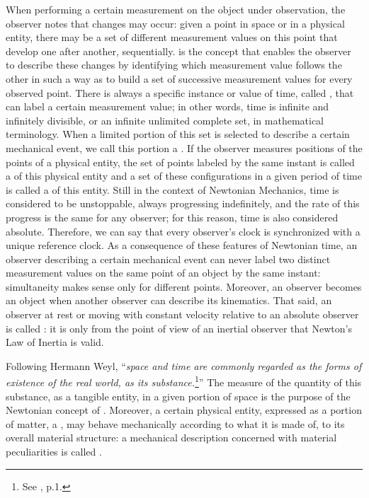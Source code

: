 When performing a certain measurement on the object under observation, the observer notes that changes may occur: given a point in space or in a physical entity, there may be a set of different measurement values on this point that develop one after another, sequentially.  is the concept that enables the observer to describe these changes by identifying which measurement value follows the other in such a way as to build a set of successive measurement values for every observed point. There is always a specific instance or value of time, called , that can label a certain measurement value; in other words, time is infinite and infinitely divisible, or an infinite unlimited complete set, in mathematical terminology. When a limited portion of this set is selected to describe a certain mechanical event, we call this portion a . If the observer measures positions of the points of a physical entity, the set of points labeled by the same instant is called a  of this physical entity and a set of these configurations in a given period of time is called a  of this entity. Still in the context of Newtonian Mechanics, time is considered to be unstoppable, always progressing indefinitely, and the rate of this progress is the same for any observer; for this reason, time is also considered absolute. Therefore, we can say that every observer's clock is synchronized with a unique reference clock. As a consequence of these features of Newtonian time, an observer describing a certain mechanical event can never label two distinct measurement values on the same point of an object by the same instant: simultaneity makes sense only for different points. Moreover, an observer becomes an object when another observer can describe its kinematics. That said, an observer at rest or moving with constant velocity relative to an absolute observer is called : it is only from the point of view of an inertial observer that Newton's Law of Inertia is valid.  


Following Hermann Weyl, ``\emph{space and time are commonly regarded as the forms of existence of the real world,  as its substance.}\footnote{See \cite{weyl_1952_2}, p.1.}'' The measure of the quantity of this substance, as a tangible entity, in a given portion of space is the purpose of the Newtonian concept of . Moreover, a certain physical entity, expressed as a portion of matter, a , may behave mechanically according to what it is made of, to its overall material structure: a mechanical description concerned with material peculiarities is called .


